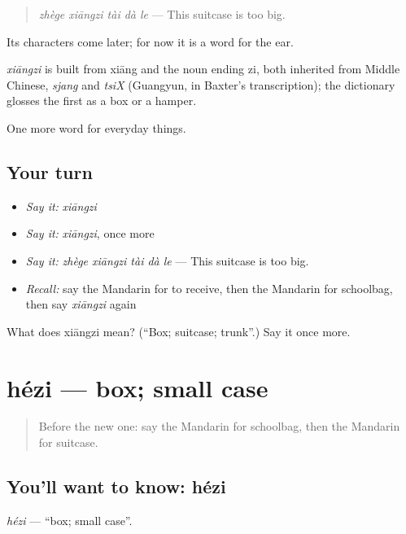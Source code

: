 \begin{quote}
\emph{zhège xiāngzi tài dà le} — This suitcase is too big.
\end{quote}

Its characters come later; for now it is a word for the ear.

\begin{cousinweb}
\emph{xiāngzi} is built from xiāng and the noun ending zi, both inherited from Middle Chinese, \emph{sjang} and \emph{tsiX} (Guangyun, in Baxter's transcription); the dictionary glosses the first as a box or a hamper.
\end{cousinweb}

\begin{grammarlens}[title={What you've built}]
One more word for everyday things.
\end{grammarlens}

\subsection*{Your turn}
\begin{itemize}
\raggedright
  \item \emph{Say it:} \emph{xiāngzi}
  \item \emph{Say it:} \emph{xiāngzi}, once more
  \item \emph{Say it:} \emph{zhège xiāngzi tài dà le} — This suitcase is too big.
  \item \emph{Recall:} say the Mandarin for to receive, then the Mandarin for schoolbag, then say \emph{xiāngzi} again
\end{itemize}

\begin{tcolorbox}[breakable,colback=teal!4,colframe=teal!35!black,title={Before you move on}]
What does xiāngzi mean? (\textquotedblleft{}Box; suitcase; trunk\textquotedblright{}.) Say it once more.
\end{tcolorbox}
\section[hézi]{hézi — box; small case}

\label{lesson:ZH-C119-hezi}



\begin{quote}
Before the new one: say the Mandarin for schoolbag, then the Mandarin for suitcase.
\end{quote}

\subsection*{You'll want to know: hézi}
\emph{hézi} — \textquotedblleft{}box; small case\textquotedblright{}.

